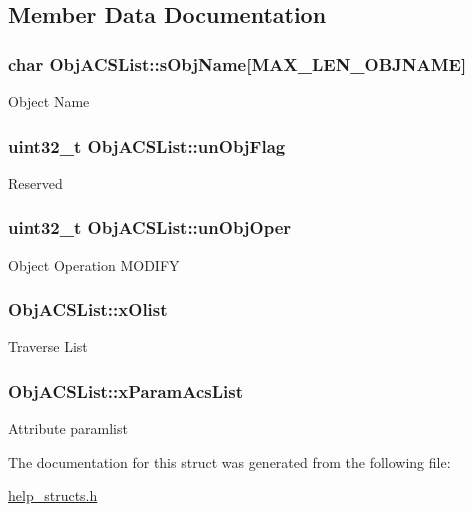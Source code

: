 \subsection{Member Data Documentation}
\hypertarget{structObjACSList_a5a1925a2876def6021fd40ee97408e9a}{
\subsubsection[{s\-Obj\-Name}]{\setlength{\rightskip}{0pt plus 5cm}char Obj\-A\-C\-S\-List\-::s\-Obj\-Name\mbox{[}{\bf M\-A\-X\-\_\-\-L\-E\-N\-\_\-\-O\-B\-J\-N\-A\-M\-E}\mbox{]}}}\label{structObjACSList_a5a1925a2876def6021fd40ee97408e9a}
Object Name \hypertarget{structObjACSList_a20243515414dc476a03d3b437b54cb58}{
\subsubsection[{un\-Obj\-Flag}]{\setlength{\rightskip}{0pt plus 5cm}uint32\-\_\-t Obj\-A\-C\-S\-List\-::un\-Obj\-Flag}}\label{structObjACSList_a20243515414dc476a03d3b437b54cb58}
Reserved \hypertarget{structObjACSList_a16665051fe33c9451c7c5a1dc30c5ec6}{
\subsubsection[{un\-Obj\-Oper}]{\setlength{\rightskip}{0pt plus 5cm}uint32\-\_\-t Obj\-A\-C\-S\-List\-::un\-Obj\-Oper}}\label{structObjACSList_a16665051fe33c9451c7c5a1dc30c5ec6}
Object Operation M\-O\-D\-I\-F\-Y \hypertarget{structObjACSList_a24b267f9dc8ae7bc18775991d5391c05}{
\subsubsection[{x\-Olist}]{ Obj\-A\-C\-S\-List\-::x\-Olist}}\label{structObjACSList_a24b267f9dc8ae7bc18775991d5391c05}
Traverse List \hypertarget{structObjACSList_acb11fa2a0af21d974914dae699be33a0}{
\subsubsection[{x\-Param\-Acs\-List}]{ Obj\-A\-C\-S\-List\-::x\-Param\-Acs\-List}}\label{structObjACSList_acb11fa2a0af21d974914dae699be33a0}
Attribute paramlist 

The documentation for this struct was generated from the following file\-:\begin{DoxyCompactItemize}
\item 
\hyperlink{help__structs_8h}{help\-\_\-structs.\-h}\end{DoxyCompactItemize}
